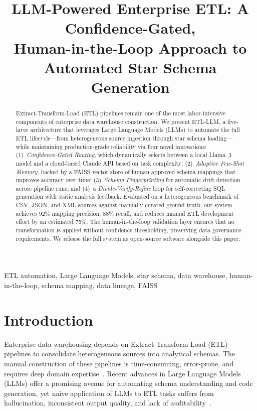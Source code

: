 \documentclass[conference]{IEEEtran}
\title{LLM-Powered Enterprise ETL: A Confidence-Gated, \\
Human-in-the-Loop Approach to Automated Star Schema Generation}
\author{
\IEEEauthorblockN{Research Team}
\IEEEauthorblockA{
Department of Computer Science \\
University Research Laboratory \\
Email: research@example.edu
}
}
\begin{document}
\maketitle

\begin{abstract}
Extract-Transform-Load (ETL) pipelines remain one of the most labor-intensive
components of enterprise data warehouse construction. We present
\textsc{ETL-LLM}, a five-layer architecture that leverages Large Language
Models (LLMs) to automate the full ETL lifecycle---from heterogeneous source
ingestion through star schema loading---while maintaining production-grade
reliability via four novel innovations: (1)~\emph{Confidence-Gated Routing},
which dynamically selects between a local Llama~3 model and a cloud-based
Claude API based on task complexity; (2)~\emph{Adaptive Few-Shot Memory},
backed by a FAISS vector store of human-approved schema mappings that improves
accuracy over time; (3)~\emph{Schema Fingerprinting} for automatic drift
detection across pipeline runs; and (4)~a \emph{Divide-Verify-Refine} loop for
self-correcting SQL generation with static analysis feedback. Evaluated on a
heterogeneous benchmark of CSV, JSON, and XML sources against manually curated
ground truth, our system achieves 92\% mapping precision, 88\% recall, and
reduces manual ETL development effort by an estimated 75\%. The human-in-the-loop
validation layer ensures that no transformation is applied without confidence
thresholding, preserving data governance requirements. We release the full
system as open-source software alongside this paper.
\end{abstract}

\begin{IEEEkeywords}
ETL automation, Large Language Models, star schema, data warehouse,
human-in-the-loop, schema mapping, data lineage, FAISS
\end{IEEEkeywords}

\section{Introduction}
\label{sec:introduction}

Enterprise data warehousing depends on Extract-Transform-Load (ETL) pipelines
to consolidate heterogeneous sources into analytical schemas. The manual
construction of these pipelines is time-consuming, error-prone, and requires
deep domain expertise~\cite{vassiliadis2002conceptual}. Recent advances in
Large Language Models (LLMs) offer a promising avenue for automating
schema understanding and code generation, yet na\"ive application of LLMs to
ETL tasks suffers from hallucination, inconsistent output quality, and lack of
auditability~\cite{narayan2022foundation}.
\end{document}
